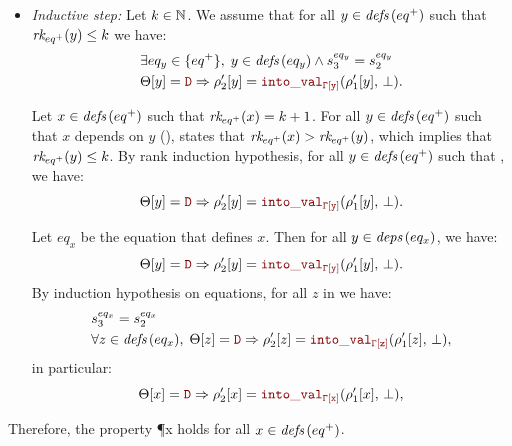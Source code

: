 \begin{skippableproof}
\begin{itemize}
        \item \textit{Inductive step:} Let $k \in \mathbb{N}$.
              We assume that for all $y \in {\ensuremath{\textit{defs}\left(eq^+\right)}}$ such that ${\textit{rk}_{eq^+}(y)} \le k$
              we have:
              \begin{align*}
                   & \exists eq_y \in \{eq^+\}, \; y \in \defs{eq_y} \wedge s_3^{eq_y} = s_2^{eq_y}     \\
                   & \Theta[y] = \dType \Rightarrow \rho'_2[y] = \intoVal{\tyCtx[y]}{\rho'_1[y]}{\bot}.
              \end{align*}

              Let $x \in {\ensuremath{\textit{defs}\left(eq^+\right)}}$ such that ${\textit{rk}_{eq^+}(x)} = k+1$. For all
              $y \in {\ensuremath{\textit{defs}\left(eq^+\right)}}$ such that $x$ depends on $y$ (\ie {}),
               states that
              ${\textit{rk}_{eq^+}(x)} > {\textit{rk}_{eq^+}(y)}$, which implies that
              ${\textit{rk}_{eq^+}(y)} \le k$. By rank induction hypothesis, for all
              $y \in {\ensuremath{\textit{defs}\left(eq^+\right)}}$ such that , we have:
              \begin{equation*}
                  \Theta[y] = \dType \Rightarrow \rho'_2[y] = \intoVal{\tyCtx[y]}{\rho'_1[y]}{\bot}.
              \end{equation*}

              Let $eq_x$ be the equation that defines $x$. Then for all
              $y \in {\ensuremath{\textit{deps}\left(eq_x\right)}}$, we have:
              \begin{equation*}
                  \Theta[y] = \dType \Rightarrow \rho'_2[y] = \intoVal{\tyCtx[y]}{\rho'_1[y]}{\bot}.
              \end{equation*}
              By induction hypothesis on equations, for all $z$ in  we have:
              \begin{align*}
                   & s_3^{eq_x} = s_2^{eq_x}                                                                                          \\
                   & \forall z \in \defs{eq_x}, \; \Theta[z] = \dType \Rightarrow \rho'_2[z] = \intoVal{\tyCtx[z]}{\rho'_1[z]}{\bot},
              \end{align*}
              in particular:
              \begin{equation*}
                  \Theta[x] = \dType \Rightarrow \rho'_2[x] = \intoVal{\tyCtx[x]}{\rho'_1[x]}{\bot},
              \end{equation*}
    \end{itemize}
    Therefore, the property \P{x} holds for all $x \in {\ensuremath{\textit{defs}\left(eq^+\right)}}$.


\end{skippableproof}
